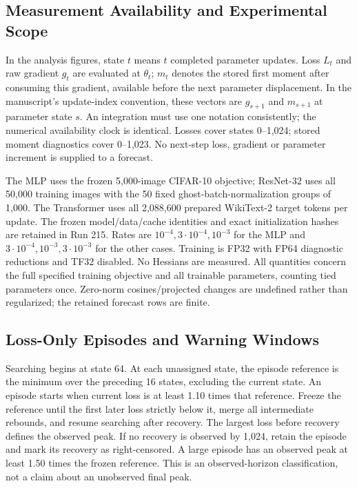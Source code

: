 \subsection{Measurement Availability and Experimental Scope}

In the analysis figures, state $t$ means $t$ completed parameter updates.
Loss $L_t$ and raw gradient $g_t$ are evaluated at $\theta_t$; $m_t$ denotes the
stored first moment after consuming this gradient, available before the next
parameter displacement. In the manuscript's update-index convention, these
vectors are $g_{s+1}$ and $m_{s+1}$ at parameter state $s$. An integration must
use one notation consistently; the numerical availability clock is identical.
Losses cover states 0--1,024; stored moment diagnostics cover 0--1,023.
No next-step loss, gradient or parameter increment is supplied to a forecast.

The MLP uses the frozen 5,000-image CIFAR-10 objective; ResNet-32 uses all 50,000
training images with the 50 fixed ghost-batch-normalization groups of 1,000.
The Transformer uses all 2,088,600 prepared WikiText-2 target tokens per update.
The frozen model/data/cache identities and exact initialization hashes are
retained in Run 215. Rates are $10^{-4},3\cdot 10^{-4},10^{-3}$ for the MLP and
$3\cdot 10^{-4},10^{-3},3\cdot 10^{-3}$ for the other cases. Training is FP32
with FP64 diagnostic reductions and TF32 disabled. No Hessians are measured.
All quantities concern the full specified training objective and all trainable
parameters, counting tied parameters once. Zero-norm cosines/projected changes
are undefined rather than regularized; the retained forecast rows are finite.

\subsection{Loss-Only Episodes and Warning Windows}

Searching begins at state 64. At each unassigned state, the episode reference
is the minimum over the preceding 16 states, excluding the current state.
An episode starts when current loss is at least 1.10 times that reference.
Freeze the reference until the first later loss strictly below it, merge all
intermediate rebounds, and resume searching after recovery. The largest loss
before recovery defines the observed peak. If no recovery is observed by 1,024,
retain the episode and mark its recovery as right-censored. A large episode
has an observed peak at least 1.50 times the frozen reference. This is an
observed-horizon classification, not a claim about an unobserved final peak.

